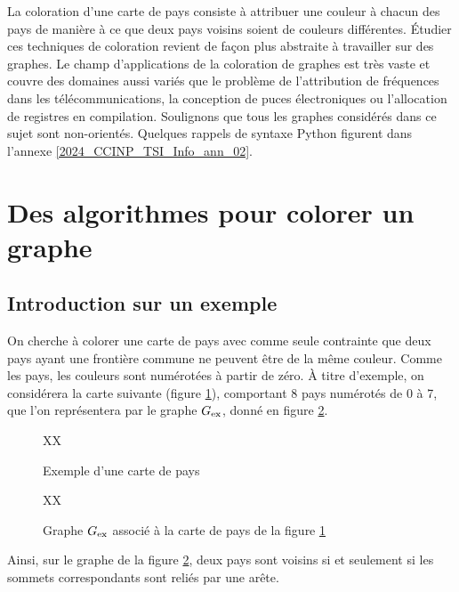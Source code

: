 
La coloration d'une carte de pays consiste à attribuer une couleur à chacun des pays de manière à ce que deux pays voisins soient de couleurs différentes.
Étudier ces techniques de coloration revient de façon plus abstraite à travailler sur des graphes.
Le champ d'applications de la coloration de graphes est très vaste et couvre des domaines aussi variés que le problème de l'attribution de fréquences dans les télécommunications, la conception de puces électroniques ou l'allocation de registres en compilation.
Soulignons que tous les graphes considérés dans ce sujet sont non-orientés. Quelques rappels de syntaxe Python figurent dans l'annexe \ref{2024_CCINP_TSI_Info_ann_02}.

\section{Des algorithmes pour colorer un graphe \label{2024_CCINP_TSI_Info_sec_01}}
\subsection{Introduction sur un exemple \label{2024_CCINP_TSI_Info_sec_01_1}}
On cherche à colorer une carte de pays avec comme seule contrainte que deux pays ayant une frontière commune ne peuvent être de la même couleur.
Comme les pays, les couleurs sont numérotées à partir de zéro.
À titre d'exemple, on considérera la carte suivante (figure \ref{2024_CCINP_TSI_Info_fig_01}), comportant 8 pays numérotés de 0 à 7, que l'on représentera par le graphe ${G}_{\text{ex}}$, donné en figure \ref{2024_CCINP_TSI_Info_fig_02}.

\begin{figure}[!h]
\centering
XX
\caption{Exemple d'une carte de pays \label{2024_CCINP_TSI_Info_fig_01}}
\end{figure}

\begin{figure}[!h]
\centering
XX
\caption{Graphe ${G}_{\text{ex}}$ associé à la carte de pays de la figure \ref{2024_CCINP_TSI_Info_fig_01}\label{2024_CCINP_TSI_Info_fig_02}}
\end{figure}

Ainsi, sur le graphe de la figure \ref{2024_CCINP_TSI_Info_fig_02}, deux pays sont voisins si et seulement si les sommets correspondants sont reliés par une arête.


\ifprof
\begin{corrige}

\end{corrige}
\else
\fi

